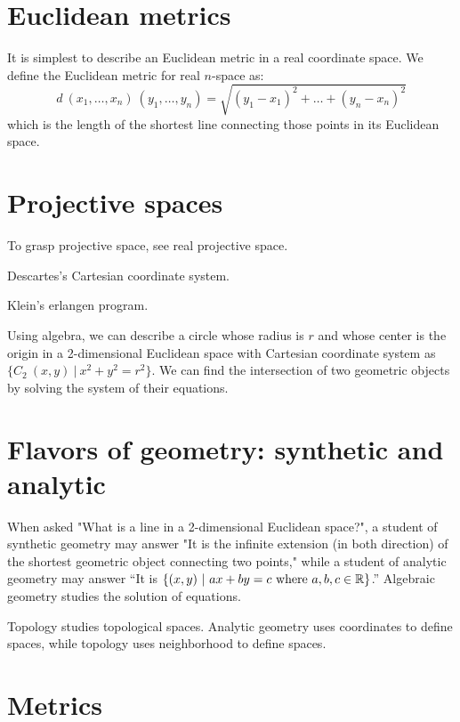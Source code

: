 \section{Euclidean metrics}

It is simplest to describe an Euclidean metric in a real coordinate space.
We define the Euclidean metric for real $n$-space as:
\[
d~(x_1,\ldots,x_n)~(y_1,\ldots,y_n) = \sqrt{(y_1-x_1)^2+\ldots+(y_n-x_n)^2}
\]
which is the length of the shortest line connecting those points in its Euclidean space.

\section{Projective spaces}

To grasp projective space, see real projective space.

Descartes's Cartesian coordinate system.

Klein's erlangen program.

Using algebra, we can describe a circle whose radius is $r$
and whose center is the origin in a 2-dimensional Euclidean space with Cartesian coordinate system
as $\{C_2~(x,y) ~|~ x^2+y^2 = r^2\}$.
We can find the intersection of two geometric objects
by solving the system of their equations.

\section{Flavors of geometry: synthetic and analytic}

When asked "What is a line in a 2-dimensional Euclidean space?",
a student of
synthetic geometry
may answer "It is the infinite extension (in both direction)
of the shortest geometric object connecting two points,"
while a student of
analytic geometry
may answer
``It is $\{ (x,y) ~|~ ax+by=c \text{ where } a,b,c\in\mathbb{R} \}$.''
Algebraic geometry studies the solution of equations.

Topology studies topological spaces.
Analytic geometry uses coordinates to define spaces,
while topology uses neighborhood to define spaces.

\section{Metrics}

